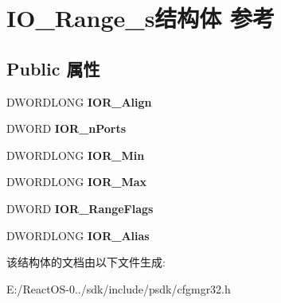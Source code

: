 \hypertarget{struct_i_o___range__s}{}\section{I\+O\+\_\+\+Range\+\_\+s结构体 参考}
\label{struct_i_o___range__s}
\subsection*{Public 属性}
\begin{DoxyCompactItemize}
\item 
\mbox{\label{struct_i_o___range__s_a5e76fea50bf3fb267ab150ee1090d072}} 
D\+W\+O\+R\+D\+L\+O\+NG {\bfseries I\+O\+R\+\_\+\+Align}
\item 
\mbox{\label{struct_i_o___range__s_a1462fb6a224f68e91a90f093f22729a3}} 
D\+W\+O\+RD {\bfseries I\+O\+R\+\_\+n\+Ports}
\item 
\mbox{\label{struct_i_o___range__s_ad9e20d9063c92425184ed4e61c9cbf2a}} 
D\+W\+O\+R\+D\+L\+O\+NG {\bfseries I\+O\+R\+\_\+\+Min}
\item 
\mbox{\label{struct_i_o___range__s_a2f2f0a6cd83b12f4aa7659f1d7df38bf}} 
D\+W\+O\+R\+D\+L\+O\+NG {\bfseries I\+O\+R\+\_\+\+Max}
\item 
\mbox{\label{struct_i_o___range__s_a4d8b2effb71c0b48a4dfbd90fda44b80}} 
D\+W\+O\+RD {\bfseries I\+O\+R\+\_\+\+Range\+Flags}
\item 
\mbox{\label{struct_i_o___range__s_a7292a324d671013f685d2b51447f91f3}} 
D\+W\+O\+R\+D\+L\+O\+NG {\bfseries I\+O\+R\+\_\+\+Alias}
\end{DoxyCompactItemize}


该结构体的文档由以下文件生成\+:\begin{DoxyCompactItemize}
\item 
E\+:/\+React\+O\+S-\/0../sdk/include/psdk/cfgmgr32.\+h\end{DoxyCompactItemize}
